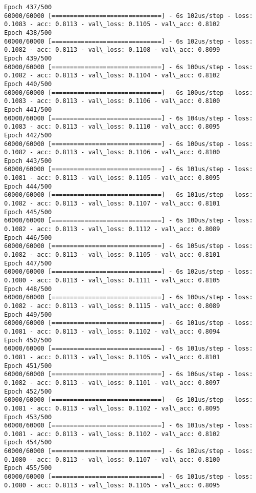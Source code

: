 \documentclass[11pt]{article}
\begin{document}
\begin{Verbatim}[commandchars=\\\{\}]
Epoch 437/500
60000/60000 [==============================] - 6s 102us/step - loss: 0.1083 - acc: 0.8113 - val\_loss: 0.1105 - val\_acc: 0.8102
Epoch 438/500
60000/60000 [==============================] - 6s 102us/step - loss: 0.1082 - acc: 0.8113 - val\_loss: 0.1108 - val\_acc: 0.8099
Epoch 439/500
60000/60000 [==============================] - 6s 100us/step - loss: 0.1082 - acc: 0.8113 - val\_loss: 0.1104 - val\_acc: 0.8102
Epoch 440/500
60000/60000 [==============================] - 6s 100us/step - loss: 0.1083 - acc: 0.8113 - val\_loss: 0.1106 - val\_acc: 0.8100
Epoch 441/500
60000/60000 [==============================] - 6s 104us/step - loss: 0.1083 - acc: 0.8113 - val\_loss: 0.1110 - val\_acc: 0.8095
Epoch 442/500
60000/60000 [==============================] - 6s 100us/step - loss: 0.1082 - acc: 0.8113 - val\_loss: 0.1106 - val\_acc: 0.8100
Epoch 443/500
60000/60000 [==============================] - 6s 101us/step - loss: 0.1081 - acc: 0.8113 - val\_loss: 0.1105 - val\_acc: 0.8095
Epoch 444/500
60000/60000 [==============================] - 6s 101us/step - loss: 0.1082 - acc: 0.8113 - val\_loss: 0.1107 - val\_acc: 0.8101
Epoch 445/500
60000/60000 [==============================] - 6s 100us/step - loss: 0.1082 - acc: 0.8113 - val\_loss: 0.1112 - val\_acc: 0.8089
Epoch 446/500
60000/60000 [==============================] - 6s 105us/step - loss: 0.1082 - acc: 0.8113 - val\_loss: 0.1105 - val\_acc: 0.8101
Epoch 447/500
60000/60000 [==============================] - 6s 102us/step - loss: 0.1080 - acc: 0.8113 - val\_loss: 0.1111 - val\_acc: 0.8105
Epoch 448/500
60000/60000 [==============================] - 6s 100us/step - loss: 0.1082 - acc: 0.8113 - val\_loss: 0.1115 - val\_acc: 0.8089
Epoch 449/500
60000/60000 [==============================] - 6s 101us/step - loss: 0.1081 - acc: 0.8113 - val\_loss: 0.1102 - val\_acc: 0.8094
Epoch 450/500
60000/60000 [==============================] - 6s 101us/step - loss: 0.1081 - acc: 0.8113 - val\_loss: 0.1105 - val\_acc: 0.8101
Epoch 451/500
60000/60000 [==============================] - 6s 106us/step - loss: 0.1082 - acc: 0.8113 - val\_loss: 0.1101 - val\_acc: 0.8097
Epoch 452/500
60000/60000 [==============================] - 6s 101us/step - loss: 0.1081 - acc: 0.8113 - val\_loss: 0.1102 - val\_acc: 0.8095
Epoch 453/500
60000/60000 [==============================] - 6s 101us/step - loss: 0.1081 - acc: 0.8113 - val\_loss: 0.1102 - val\_acc: 0.8102
Epoch 454/500
60000/60000 [==============================] - 6s 102us/step - loss: 0.1080 - acc: 0.8113 - val\_loss: 0.1107 - val\_acc: 0.8100
Epoch 455/500
60000/60000 [==============================] - 6s 101us/step - loss: 0.1080 - acc: 0.8113 - val\_loss: 0.1105 - val\_acc: 0.8095

\end{Verbatim}
\end{document}
